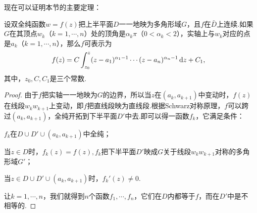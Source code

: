 现在可以证明本节的主要定理：
\begin{theorem}\label{thm7.4.3}
  设双全纯函数$w=f(z)$把上半平面$D$一一地映为多角形域$G$，且$f$在$\bar D$上连续.如果$G$在其顶点$w_k$（$k=1,\cdots,n$）处的顶角是$\alpha_k\pi$（$0<\alpha_k<2$），实轴上与$w_k$对应的点是$a_k$（$k=1,\cdots,n$），那么$f$可表示为
  \begin{equation}\label{eq7.4.5}
    f(z) = C\int_{z_0}^z(z-a_1)^{\alpha_1-1}\cdots(z-a_n)^{\alpha_n-1}\mathop{}\!\mathrm dz+C_1,
  \end{equation}
  其中，$z_0,C,C_1$是三个常数.
\end{theorem}
\begin{proof}
  由于$f$把实轴一一地映为$G$的边界，所以当$z$在$(a_k,a_{k+1})$中变动时，$f(z)$在线段$w_kw_{k+1}$上变动，即$f$把直线段映为直线段.根据Schwarz对称原理，$f$可以跨过$(a_k,a_{k+1})$，全纯开拓到下半平面$D'$中去.即可以得一函数$f_k$，它满足条件：
  \begin{eenum}
    \item $f_k$在$D\cup D'\cup(a_k,a_{k+1})$中全纯；
    \item 当$z\in D$时，$f_k(z)=f(z),f_k$把下半平面$D'$映成$G$关于线段$w_kw_{k+1}$对称的多角形域$G'$；
    \item 当$z\in D\cup D'\cup(a_k,a_{k+1})$时，$f_k'(z)\ne0$.
  \end{eenum}
  让$k=1,\cdots,n$，我们就得到$n$个函数$f_1,\cdots,f_n$，它们在$D$内都等于$f$，而在$D'$中是不相等的.


\end{proof}
